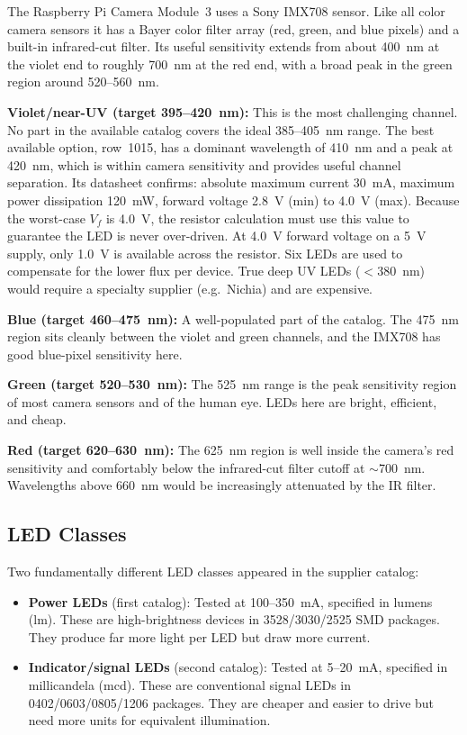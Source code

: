 \documentclass[12pt,letterpaper]{article}
\begin{document}
The Raspberry Pi Camera Module~3 uses a Sony IMX708 sensor. Like all color camera sensors
it has a Bayer color filter array (red, green, and blue pixels) and a built-in infrared-cut
filter. Its useful sensitivity extends from about 400~nm at the violet end to roughly
700~nm at the red end, with a broad peak in the green region around 520--560~nm.

\textbf{Violet/near-UV (target 395--420~nm):} This is the most challenging channel.
No part in the available catalog covers the ideal 385--405~nm range. The best available
option, row~1015, has a dominant wavelength of 410~nm and a peak at 420~nm, which is
within camera sensitivity and provides useful channel separation. Its datasheet confirms:
absolute maximum current 30~mA, maximum power dissipation 120~mW, forward voltage
2.8~V (min) to 4.0~V (max). Because the worst-case $V_f$ is 4.0~V, the resistor
calculation must use this value to guarantee the LED is never over-driven.
At 4.0~V forward voltage on a 5~V supply, only 1.0~V is available across the resistor.
Six LEDs are used to compensate for the lower flux per device. True deep UV LEDs
($<$380~nm) would require a specialty supplier (e.g.\ Nichia) and are expensive.

\textbf{Blue (target 460--475~nm):} A well-populated part of the catalog. The 475~nm
region sits cleanly between the violet and green channels, and the IMX708 has good
blue-pixel sensitivity here.

\textbf{Green (target 520--530~nm):} The 525~nm range is the peak sensitivity region of
most camera sensors and of the human eye. LEDs here are bright, efficient, and cheap.

\textbf{Red (target 620--630~nm):} The 625~nm region is well inside the camera's red
sensitivity and comfortably below the infrared-cut filter cutoff at $\sim$700~nm.
Wavelengths above 660~nm would be increasingly attenuated by the IR filter.

\subsection{LED Classes}

Two fundamentally different LED classes appeared in the supplier catalog:

\begin{itemize}[leftmargin=2em]
  \item \textbf{Power LEDs} (first catalog): Tested at 100--350~mA, specified in lumens
    (lm). These are high-brightness devices in 3528/3030/2525 SMD packages. They produce
    far more light per LED but draw more current.

  \item \textbf{Indicator/signal LEDs} (second catalog): Tested at 5--20~mA, specified
    in millicandela (mcd). These are conventional signal LEDs in 0402/0603/0805/1206
    packages. They are cheaper and easier to drive but need more units for equivalent
    illumination.
\end{itemize}
\end{document}
